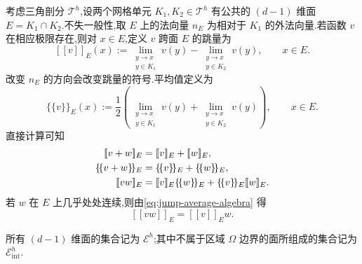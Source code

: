 \begin{note}[函数在单元面上的跳量与平均值]\label{note:jumps-and-averages}
考虑三角剖分 $\mathcal{T}^h$,设两个网格单元 $K_1,K_2\in\mathcal{T}^h$ 有公共的 $(d-1)$ 维面 $E=K_1\cap K_2$.不失一般性,取 $E$ 上的法向量 $n_E$ 为相对于 $K_1$ 的外法向量.若函数 $v$ 在相应极限存在,则对 $x\in E$,定义 $v$ 跨面 $E$ 的跳量为
\begin{equation}\label{eq:jump-definition}
  [\![v]\!]_E(x)
    :=\lim_{\substack{y\to x\\y\in K_1}}v(y)
      -\lim_{\substack{y\to x\\y\in K_2}}v(y),
      \qquad x\in E.
\end{equation}
改变 $n_E$ 的方向会改变跳量的符号.平均值定义为
\[
  \{\!\{v\}\!\}_E(x)
    :=\frac12\left(
       \lim_{\substack{y\to x\\y\in K_1}}v(y)
       +\lim_{\substack{y\to x\\y\in K_2}}v(y)\right),
       \qquad x\in E.
\]
直接计算可知
\begin{equation}\label{eq:jump-average-algebra}
\begin{aligned}
  \relax[\![v+w]\!]_E&=[\![v]\!]_E+[\![w]\!]_E,\\
  \{\!\{v+w\}\!\}_E&=\{\!\{v\}\!\}_E+\{\!\{w\}\!\}_E,\\
  [\![vw]\!]_E&=[\![v]\!]_E\{\!\{w\}\!\}_E
                +\{\!\{v\}\!\}_E[\![w]\!]_E.
\end{aligned}
\end{equation}
若 $w$ 在 $E$ 上几乎处处连续,则由\cref{eq:jump-average-algebra} 得
\[
  [\![vw]\!]_E=[\![v]\!]_Ew.
\]
\end{note}

\begin{note}[$(d-1)$ 维面的集合]\label{note:face-sets}
所有 $(d-1)$ 维面的集合记为 $\mathcal{E}^h$;其中不属于区域 $\Omega$ 边界的面所组成的集合记为 $\mathcal{E}_{\mathrm{int}}^h$.
\end{note}

